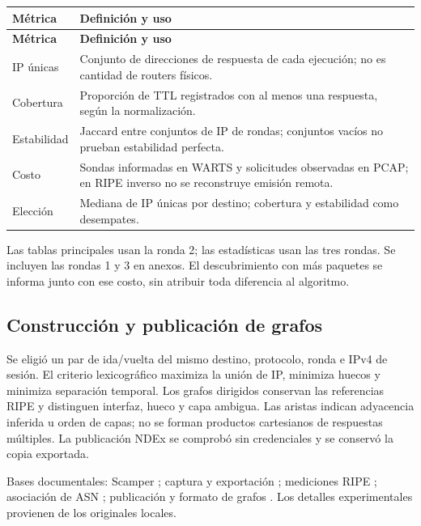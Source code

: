 \begingroup
\fontsize{9}{11}\selectfont
\addtocounter{table}{-1}
\begin{longtable}{p{3cm}p{11.3cm}}
\toprule
\textbf{Métrica} & \textbf{Definición y uso} \\ \midrule
\endfirsthead
\toprule
\textbf{Métrica} & \textbf{Definición y uso} \\ \midrule
\endhead
IP únicas & Conjunto de direcciones de respuesta de cada ejecución; no es cantidad de routers físicos. \\
Cobertura & Proporción de TTL registrados con al menos una respuesta, según la normalización. \\
Estabilidad & Jaccard entre conjuntos de IP de rondas; conjuntos vacíos no prueban estabilidad perfecta. \\
Costo & Sondas informadas en WARTS y solicitudes observadas en PCAP; en RIPE inverso no se reconstruye emisión remota. \\
Elección & Mediana de IP únicas por destino; cobertura y estabilidad como desempates. \\
\bottomrule
\end{longtable}
\endgroup
Las tablas principales usan la ronda 2; las estadísticas usan las tres rondas. Se incluyen las rondas 1 y 3 en anexos. El descubrimiento con más paquetes se informa junto con ese costo, sin atribuir toda diferencia al algoritmo.

\subsection{Construcción y publicación de grafos}
Se eligió un par de ida/vuelta del mismo destino, protocolo, ronda e IPv4 de sesión. El criterio lexicográfico maximiza la unión de IP, minimiza huecos y minimiza separación temporal. Los grafos dirigidos conservan las referencias RIPE y distinguen interfaz, hueco y capa ambigua. Las aristas indican adyacencia inferida u orden de capas; no se forman productos cartesianos de respuestas múltiples. La publicación NDEx se comprobó sin credenciales y se conservó la copia exportada.

\noindent Bases documentales: Scamper \cite{ref1}; captura y exportación \cite{ref2}; mediciones RIPE \cite{ref3}; asociación de ASN \cite{ref4}; publicación y formato de grafos \cite{ref5,ref6}. Los detalles experimentales provienen de los originales locales.
